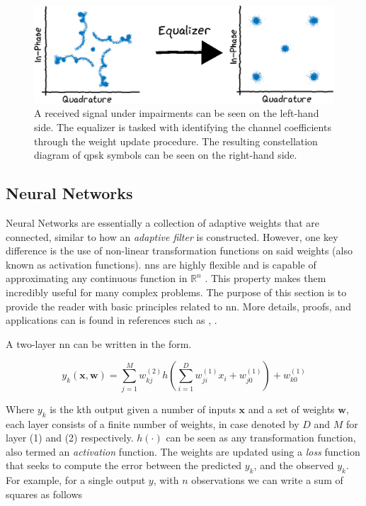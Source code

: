 \begin{figure}
    \centering
    \includegraphics[width=\textwidth]{chapters/part_pathloss/figures/equalizer_example.eps}
    \caption{A received signal under impairments can be seen on the left-hand side. The equalizer is tasked with identifying the channel coefficients through the weight update procedure. The resulting constellation diagram of \gls{qpsk} symbols can be seen on the right-hand side. }
    \label{fig:equalizer_example}
\end{figure}

\subsection{Neural Networks}\label{sec:neural_networks}

Neural Networks are essentially a collection of adaptive weights that are connected, similar to how an \emph{adaptive filter} is constructed. However, one key difference is the use of non-linear transformation functions on said weights (also known as activation functions). \glspl{nn} are highly flexible and is capable of approximating any continuous function in $\mathbb{R}^n$ \cite{Nielsen2015}. This property makes them incredibly useful for many complex problems. The purpose of this section is to provide the reader with basic principles related to \gls{nn}. More details, proofs, and applications can is found in references such as \cite{Nielsen2015}, \cite{M.Bishop2006}.

A two-layer \gls{nn} can be written in the form.

\begin{equation}\label{eq:neural_network}
  y_k(\mathbf{x},\mathbf{w}) = \sum_{j=1}^M w_{kj}^{(2)} h\left( \sum_{i=1}^D w_{ji}^{(1)}x_i+w_{j0}^{(1)} \right) +w_{k0}^{(1)}
\end{equation}

Where $y_k$ is the kth output given a number of inputs $\mathbf{x}$ and a set of weights $\mathbf{w}$, each layer consists of a finite number of weights, in case denoted by $D$ and $M$ for layer (1) and (2) respectively. $h(\cdot)$ can be seen as any transformation function, also termed an \emph{activation} function. The weights are updated using a \emph{loss} function that seeks to compute the error between the predicted $y_k$, and the observed $y_k$. For example, for a single output $y$, with $n$ observations we can write a sum of squares as follows


